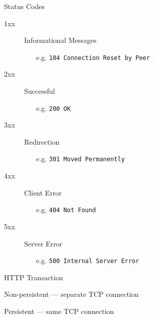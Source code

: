 \begin{frame}{Status Codes}
  \begin{description}
  \item[1xx] Informational Messages
    \begin{itemize}
    \item[e.g.] \texttt{104 Connection Reset by Peer}
    \end{itemize}
  \item[2xx] Successful
    \begin{itemize}
    \item[e.g.] \texttt{200 OK}
    \end{itemize}
  \item[3xx] Redirection
    \begin{itemize}
    \item[e.g.] \texttt{301 Moved Permanently}
    \end{itemize}
  \item[4xx] Client Error
    \begin{itemize}
    \item[e.g.] \texttt{404 Not Found}
    \end{itemize}
  \item[5xx] Server Error
    \begin{itemize}
    \item[e.g.] \texttt{500 Internal Server Error}
    \end{itemize}
  \end{description}
\end{frame}

\begin{frame}{HTTP Transaction}
  \begin{block}{Non-persistent --- separate TCP connection}
    \begin{center}
       
    \end{center}
  \end{block}
\end{frame}

\begin{frame}
  \begin{block}{Persistent --- same TCP connection}
    \begin{center}
       
    \end{center}
  \end{block}
\end{frame}

